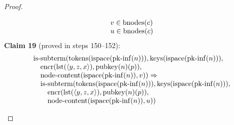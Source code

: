 \documentclass[11pt]{article}
\theoremstyle{plain}
\begin{document}
\begin{proof}
\begin{itemize}[leftmargin=2.8em, itemsep=4pt, parsep=1pt]
\begin{itemize}[leftmargin=2.8em, itemsep=4pt, parsep=1pt]
\begin{equation*}
\begin{array}{@{}l@{}}
v \in \operatorname{bnodes}(c) \\
u \in \operatorname{bnodes}(c)
\end{array}
\end{equation*}
\textbf{Claim 19} (proved in steps 150--152):
\begin{equation*}
\begin{array}{@{}l@{}} \operatorname{is\text{-}subterm}(\operatorname{tokens}(\operatorname{ispace}(\operatorname{pk\text{-}inf}(n))), \operatorname{keys}(\operatorname{ispace}(\operatorname{pk\text{-}inf}(n))), \\ \quad \operatorname{encr}(\operatorname{lst}(\langle y, z, x \rangle), \operatorname{pubkey}(n)(p)), \\ \quad \operatorname{node\text{-}content}(\operatorname{ispace}(\operatorname{pk\text{-}inf}(n)), v)) \Rightarrow \\ \quad \operatorname{is\text{-}subterm}(\operatorname{tokens}(\operatorname{ispace}(\operatorname{pk\text{-}inf}(n))), \operatorname{keys}(\operatorname{ispace}(\operatorname{pk\text{-}inf}(n))), \\ \quad \quad \operatorname{encr}(\operatorname{lst}(\langle y, z, x \rangle), \operatorname{pubkey}(n)(p)), \\ \quad \quad \operatorname{node\text{-}content}(\operatorname{ispace}(\operatorname{pk\text{-}inf}(n)), u)) \end{array}
\end{equation*}


\end{itemize}
\end{itemize}
\end{proof}
\end{document}
